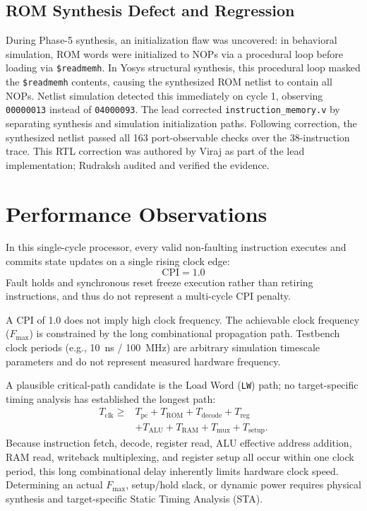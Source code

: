 \documentclass[conference,a4paper]{IEEEtran}
\begin{document}
\subsection{ROM Synthesis Defect and Regression}
During Phase-5 synthesis, an initialization flaw was uncovered: in behavioral simulation, ROM words were initialized to NOPs via a procedural loop before loading via \texttt{\$readmemh}. In Yosys structural synthesis, this procedural loop masked the \texttt{\$readmemh} contents, causing the synthesized ROM netlist to contain all NOPs. Netlist simulation detected this immediately on cycle 1, observing \texttt{00000013} instead of \texttt{04000093}. The lead corrected \texttt{instruction\_memory.v} by separating synthesis and simulation initialization paths. Following correction, the synthesized netlist passed all 163 port-observable checks over the 38-instruction trace. This RTL correction was authored by Viraj as part of the lead implementation; Rudraksh audited and verified the evidence.

\section{Performance Observations}
In this single-cycle processor, every valid non-faulting instruction executes and commits state updates on a single rising clock edge:
\begin{equation}
\text{CPI} = 1.0
\end{equation}
Fault holds and synchronous reset freeze execution rather than retiring instructions, and thus do not represent a multi-cycle CPI penalty.

A CPI of 1.0 does not imply high clock frequency. The achievable clock frequency ($F_{\max}$) is constrained by the long combinational propagation path. Testbench clock periods (e.g., 10~ns / 100~MHz) are arbitrary simulation timescale parameters and do not represent measured hardware frequency.

A plausible critical-path candidate is the Load Word (\texttt{LW}) path; no target-specific timing analysis has established the longest path:
\begin{equation}
\begin{aligned}
T_{\mathrm{clk}} \geq {}&T_{\mathrm{pc}}+T_{\mathrm{ROM}}+T_{\mathrm{decode}}+T_{\mathrm{reg}}\\
 &+T_{\mathrm{ALU}}+T_{\mathrm{RAM}}+T_{\mathrm{mux}}+T_{\mathrm{setup}} .
\end{aligned}
\end{equation}
Because instruction fetch, decode, register read, ALU effective address addition, RAM read, writeback multiplexing, and register setup all occur within one clock period, this long combinational delay inherently limits hardware clock speed. Determining an actual $F_{\max}$, setup/hold slack, or dynamic power requires physical synthesis and target-specific Static Timing Analysis (STA).
\end{document}
